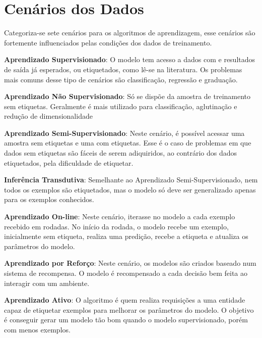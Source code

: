 \section{Cenários dos Dados}

Categoriza-se\cite{mohri2012foundations} sete cenários para os algoritmos de aprendizagem, esse cenários são fortemente influenciados pelas condições dos dados de treinamento.

\begin{description}
\item \textbf{Aprendizado Supervisionado}: O modelo tem acesso a dados com e resultados de saída já esperados, ou etiquetados, como lê-se na literatura. Os problemas mais comuns desse tipo de cenários são classificação, regressão e graduação.

\item \textbf{Aprendizado Não Supervisionado}: Só se dispõe da amostra de treinamento sem etiquetas. Geralmente é mais utilizado para classificação, aglutinação e redução de dimensionalidade

\item \textbf{Aprendizado Semi-Supervisionado}: Neste cenário, é possível acessar uma amostra sem etiquetas e uma com etiquetas. Esse é o caso de problemas em que dados sem etiquetas são fáceis de serem adiquiridos, ao contrário dos dados etiquetados, pela dificuldade de etiquetar.

\item \textbf{Inferência Transdutiva}: Semelhante ao Aprendizado Semi-Supervisionado, nem todos os exemplos são etiquetados, mas o modelo só deve ser generalizado apenas para os exemplos conhecidos.

\item \textbf{Aprendizado On-line}: Neste cenário, iterasse no modelo a cada exemplo recebido em rodadas. No início da rodada, o modelo recebe um exemplo, inicialmente sem etiqueta, realiza uma predição, recebe a etiqueta e atualiza os parâmetros do modelo.

\item \textbf{Aprendizado por Reforço}: Neste cenário, os modelos são criados baseado num sistema de recompensa. O modelo é recompensado a cada decisão bem feita ao interagir com um ambiente.

\item \textbf{Aprendizado Ativo}: O algoritmo é quem realiza requisições a uma entidade capaz de etiquetar exemplos para melhorar os parâmetros do modelo. O objetivo é conseguir gerar um modelo tão bom quando o modelo supervisionado, porém com menos exemplos.

\end{description}

